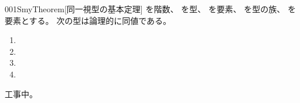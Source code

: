 \documentclass[index]{subfiles}
\begin{document}
\begin{myBlock}{001S}{myTheorem}[同一視型の基本定理]
  を階数、
  を型、
  を要素、
  を型の族、
  を要素とする。
  次の型は論理的に同値である。
  \begin{enumerate}
  \item {}
  \item {}
  \item {}
  \item {}
  \end{enumerate}
\end{myBlock}
\begin{myProof}
  工事中。
\end{myProof}
\end{document}

